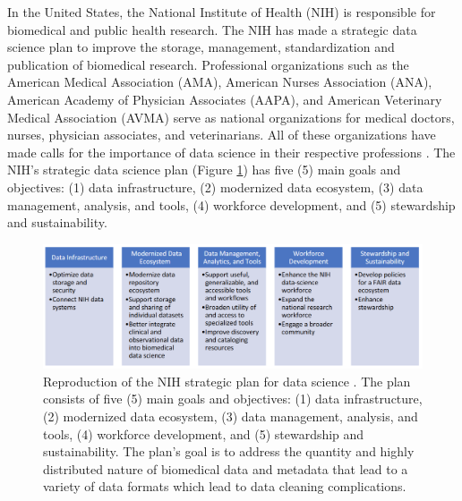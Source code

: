 \documentclass[010-intro.tex]{subfiles}
\begin{document}
In the United States,
the National Institute of Health (NIH) is responsible for biomedical and public health research.
The NIH has made a strategic data science plan to improve the
storage, management, standardization and publication of biomedical research.
Professional organizations such as the
American Medical Association (AMA),
American Nurses Association (ANA),
American Academy of Physician Associates (AAPA), and
American Veterinary Medical Association (AVMA)
serve as national organizations for medical doctors, nurses, physician associates, and veterinarians.
All of these organizations have made calls for the importance of data science in their respective professions
\cite{payneBiomedicalInformaticsMeets2018, americanmedicalassociationAcceleratingChangeMedical2021, americannursesassociationANAEnterpriseAmerican, owenEthicalIntersectionHealthcare2017, nolenArtificialIntelligenceVeterinary2020, nationalinstitutesofhealthNIHStrategicPlan2020}.
The NIH's strategic data science plan (Figure \ref{fig:nih-ds}) has five (5) main goals and objectives:
(1) data infrastructure,
(2) modernized data ecosystem,
(3) data management, analysis, and tools,
(4) workforce development, and
(5) stewardship and sustainability.

\begin{figure}[htb]
    \centering
    \includegraphics[width=\linewidth]{figs/050-intro/nih-strategic_plan_data_science}
    \caption[NIH Strategic Plan for Data Science]{
    Reproduction of the NIH strategic plan for data science \cite{nationalinstitutesofhealthNIHStrategicPlan2020}.
    The plan consists of five (5) main goals and objectives: (1) data infrastructure,
    (2) modernized data ecosystem,
    (3) data management, analysis, and tools,
    (4) workforce development, and
    (5) stewardship and sustainability.
    The plan's goal is to address the quantity and highly distributed nature of biomedical data and metadata
    that lead to a variety of data formats which lead to data cleaning complications.
    }
    \label{fig:nih-ds}
\end{figure}
\end{document}

